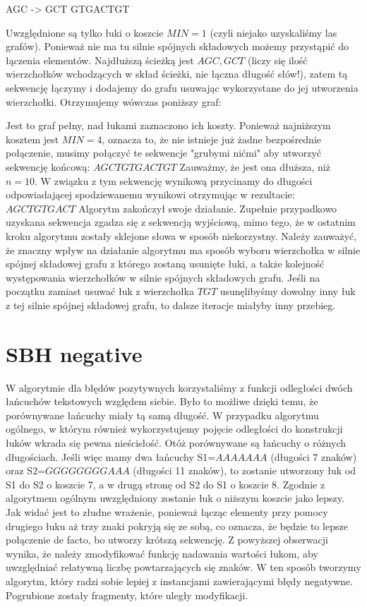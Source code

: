 \documentclass[a4paper,10pt]{article}
\begin{document}
AGC -> GCT         GTGACTGT

Uwzględnione są tylko łuki o koszcie $MIN=1$ (czyli niejako uzyskaliśmy las grafów). Ponieważ nie ma tu silnie spójnych składowych możemy przystąpić do łączenia elementów. Najdłuższą ścieżką jest $AGC, GCT$ (liczy się ilość wierzchołków wchodzących w skład ścieżki, nie łączna długość słów!), zatem tą sekwencję łączymy i dodajemy do grafu usuwając wykorzystane do jej utworzenia wierzchołki.
Otrzymujemy wówczas poniższy graf:

		 
Jest to graf pełny, nad łukami zaznaczono ich koszty. Ponieważ najniższym kosztem jest $MIN=4$, oznacza to, że nie istnieje już żadne bezpośrednie połączenie, musimy połączyć te sekwencje "grubymi nićmi" aby utworzyć sekwencję końcową:
$AGCTGTGACTGT$
Zauważmy, że jest ona dłuższa, niż $n=10$. W związku z tym sekwencję wynikową przycinamy do długości odpowiadającej spodziewanemu wynikowi otrzymując w rezultacie:
$AGCTGTGACT$
Algorytm zakończył swoje działanie. Zupełnie przypadkowo uzyskana sekwencja zgadza się z sekwencją wyjściową, mimo tego, że w ostatnim kroku algorytmu zostały sklejone słowa w sposób niekorzystny.
Należy zauważyć, że znaczny wpływ na działanie algorytmu ma sposób wyboru wierzchołka w silnie spójnej składowej grafu z którego zostaną usunięte łuki, a także kolejność występowania wierzchołków w silnie spójnych składowych grafu. Jeśli na początku zamiast usuwać łuk z wierzchołka $TGT$ usunęlibyśmy dowolny inny łuk z tej silnie spójnej składowej grafu, to dalsze iteracje miałyby inny przebieg.

\section{SBH negative}
W algorytmie dla błędów pozytywnych korzystaliśmy z funkcji odległości dwóch łańcuchów tekstowych względem siebie. Było to możliwe dzięki temu, że porównywane łańcuchy miały tą samą długość. W przypadku algorytmu ogólnego, w którym również wykorzystujemy pojęcie odległości do konstrukcji łuków wkrada się pewna nieścisłość. Otóż porównywane są łańcuchy o różnych długościach. Jeśli więc mamy dwa łańcuchy S1=$AAAAAAA$ (długości 7 znaków) oraz S2=$GGGGGGGGAAA$ (długości 11 znaków), to zostanie utworzony łuk od S1 do S2 o koszcie 7, a w drugą stronę od S2 do S1 o koszcie 8. Zgodnie z algorytmem ogólnym uwzględniony zostanie łuk o niższym koszcie jako lepszy. Jak widać jest to złudne wrażenie, ponieważ łącząc elementy przy pomocy drugiego łuku aż trzy znaki pokryją się ze sobą, co oznacza, że będzie to lepsze połączenie de facto, bo utworzy krótszą sekwencję.
Z powyższej obserwacji wynika, że należy zmodyfikować funkcję nadawania wartości łukom, aby uwzględniać relatywną liczbę powtarzających się znaków. W ten sposób tworzymy algorytm, który radzi sobie lepiej z instancjami zawierającymi błędy negatywne. Pogrubione zostały fragmenty, które uległy modyfikacji.
\end{document}
